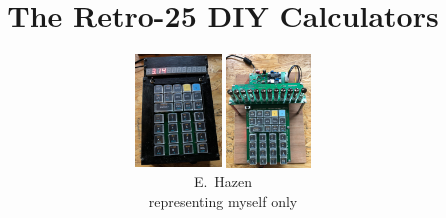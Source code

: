 \documentclass{beamer}
\begin{document}



\title{The Retro-25 DIY Calculators}
\author
{
 \begin{center}
   \includegraphics[height=3cm]{figs/led_front.jpg} 
   \includegraphics[height=3cm]{figs/vfd_over.jpg}
 \end{center}
E.~Hazen \\
representing myself only
}

\newcommand{\spage}[1]{
\begin{frame}
  \begin{tikzpicture}[remember picture, overlay]
  \node[anchor=north]at(current page.north){
     \texttt{[image: \#1]}
  };
  \end{tikzpicture}
\end{frame}
}
\frame{\titlepage}
\end{document}
